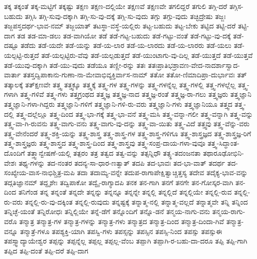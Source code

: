 {ತಕ್ಕ
ತಕ್ಕಂತೆ
ತಕ್ಕ-ಮಟ್ಟಿಗೆ
ತಕ್ಕಷ್ಟು
ತಕ್ಷಣ
ತಕ್ಷಣ-ದಲ್ಲಿಯೇ
ತಕ್ಷಣವೆ
ತಕ್ಷಣವೇ
ತಗಲಿದ್ದರೆ
ತಗುಲಿ
ತಗ್ಗಿ-ದರೆ
ತಗ್ಗಿಸ-ಬಹುದು
ತಗ್ಗಿಸಿ
ತಗ್ಗಿ-ಸುವು-ದಕ್ಕಾಗಿ
ತಗ್ಗಿ-ಸು-ವು-ದಕ್ಕೆ
ತಗ್ಗಿ-ಸು-ವುದು
ತಗ್ಗು
ತಗ್ಗು-ವುದು
ತಚ್ಛಿದ್ರೇಷು
ತಜ್ಜಃ
ತಜ್ಜಪಸ್ತದರ್ಥ-ಭಾವ-ನಮ್
ತಜ್ಜಯಾತ್
ತಟಸ್ಥಾ-ವಸ್ಥೆ-ಯಲ್ಲಿರು
ತಟ್ಟ-ಬಹುದು
ತಟ್ಟ-ಬೇಕು
ತಟ್ಟಿದ
ತಟ್ಟಿ-ದರೆ
ತಟ್ಟಿ-ದಾಗ
ತಡ
ತಡ-ಮಾ-ಡಲು
ತಡ-ವಾಗಿಯೋ
ತಡೆ
ತಡೆ-ಗಟ್ಟ-ಬಹುದು
ತಡೆ-ಗಟ್ಟು-ವಂತೆ
ತಡೆ-ಗಟ್ಟು-ವು-ದಕ್ಕೆ
ತಡೆ-ದಷ್ಟೂ
ತಡೆದು
ತಡೆ-ಯದೇ
ತಡೆ-ಯನ್ನು
ತಡೆ-ಯ-ಲಾರ
ತಡೆ-ಯ-ಲಾರದು
ತಡೆ-ಯ-ಲಾರರು
ತಡೆ-ಯಲು
ತಡೆ-ಯಲ್ಪಟ್ಟಿ-ರುತ್ತದೆ
ತಡೆ-ಯಲ್ಪಟ್ಟಿರು-ವೆವು
ತಡೆ-ಯಲ್ಪಡುತ್ತದೆ
ತಡೆ-ಯುಂಟಾಗು-ವು-ದಿಲ್ಲ
ತಡೆ-ಯುತ್ತದೆ
ತಡೆ-ಯುತ್ತವೆ
ತಡೆ-ಯುವು-ದಕ್ಕಾಗಿ
ತಡೆ-ಯು-ವುದು
ತಡೆಯೂ
ತಣ್ಣೀ-ರನ್ನು
ತತಃ
ತತಃಪ್ರಾತಿಭಶ್ರಾವಣ-ವೇದ-ನಾದರ್ಶಾಸ್ವಾದ-ವಾರ್ತಾ
ತತಸ್ತದ್ವಿಪಾಕಾನು-ಗುಣಾ-ನಾ-ಮೇವಾಭಿವ್ಯಕ್ತಿರ್ವಾಸ-ನಾಮ್
ತತೋ
ತತೋ-ಣಿಮಾದಿಪ್ರಾ-ದುರ್ಭಾವಃ
ತತ್
ತತ್ಕಾಲಕ್ಕೆ
ತತ್ಕ್ಷಣವೇ
ತತ್ತ್ವ
ತತ್ತ್ವಕ್ಕೂ
ತತ್ತ್ವಕ್ಕೆ
ತತ್ತ್ವ-ಗಳ
ತತ್ತ್ವ-ಗಳನ್ನು
ತತ್ತ್ವ-ಗಳನ್ನೆಲ್ಲ
ತತ್ತ್ವ-ಗಳಲ್ಲಿ
ತತ್ತ್ವ-ಗಳಲ್ಲೆಲ್ಲ
ತತ್ತ್ವ-ಗಳಾಗಿ
ತತ್ತ್ವ-ಗಳಿವೆ
ತತ್ತ್ವ-ಗಳು
ತತ್ತ್ವಗ್ರಂಥದ
ತತ್ತ್ವಜ್ಞ
ತತ್ತ್ವಜ್ಞ-ನಾದ
ತತ್ತ್ವಜ್ಞ-ರಂತೆ
ತತ್ತ್ವಜ್ಞ-ರಾ-ಗಲು
ತತ್ತ್ವಜ್ಞರು
ತತ್ತ್ವಜ್ಞಾನಿ
ತತ್ತ್ವಜ್ಞಾನಿ-ಗಳಾ-ಗಿದ್ದರು
ತತ್ತ್ವಜ್ಞಾನಿ-ಗಳಿಗೆ
ತತ್ತ್ವಜ್ಞಾನಿ-ಗಳಿ-ರು-ವರು
ತತ್ತ್ವಜ್ಞಾನಿ-ಗಳು
ತತ್ತ್ವಜ್ಞಾನಿಯೂ
ತತ್ತ್ವದ
ತತ್ತ್ವ-ದಲ್ಲಿ
ತತ್ತ್ವ-ದಲ್ಲೆಲ್ಲೂ
ತತ್ತ್ವ-ದಿಂದ
ತತ್ತ್ವ-ಭಾ-ಗಕ್ಕೆ
ತತ್ತ್ವ-ಭಾ-ವನೆ
ತತ್ತ್ವ-ಮಸಿ
ತತ್ತ್ವ-ವನ್ನಾ-ಗಲೀ
ತತ್ತ್ವ-ವನ್ನಾಗಿ
ತತ್ತ್ವ-ವನ್ನು
ತತ್ತ್ವ-ವಾ-ಗಿ-ರುವನು
ತತ್ತ್ವ-ವಾಗು-ವನು
ತತ್ತ್ವ-ವಾಗು-ವು-ದನ್ನು
ತತ್ತ್ವ-ವಾ-ಯಿತು
ತತ್ತ್ವ-ವಿದೆ
ತತ್ತ್ವವು
ತತ್ತ್ವ-ವೆನ್ನು-ವರು
ತತ್ತ್ವ-ವೇನೆಂದರೆ
ತತ್ತ್ವ-ಶಕ್ತಿ-ಯನ್ನು
ತತ್ತ್ವ-ಶಾಸ್ತ್ರ
ತತ್ತ್ವ-ಶಾಸ್ತ್ರ-ಗಳ
ತತ್ತ್ವ-ಶಾಸ್ತ್ರ-ಗಳಿಗೂ
ತತ್ತ್ವ-ಶಾಸ್ತ್ರಜ್ಞದ
ತತ್ತ್ವ-ಶಾಸ್ತ್ರಜ್ಞ-ರಿಗೆ
ತತ್ತ್ವ-ಶಾಸ್ತ್ರಜ್ಞರು
ತತ್ತ್ವ-ಶಾಸ್ತ್ರದ
ತತ್ತ್ವ-ಶಾಸ್ತ್ರ-ದಿಂದ
ತತ್ತ್ವ-ಶಾಸ್ತ್ರವು
ತತ್ತ್ವ-ಸಂಪ್ರ-ದಾಯ-ಗಳಾ-ವುವೂ
ತತ್ತ್ವ-ಸಿದ್ಧಾಂತ-ದೊಂದಿಗೆ
ತತ್ತ್ವಾನ್ವೇಷಣೆ-ಯಲ್ಲಿ
ತತ್ಪರಂ
ತತ್ರ
ತತ್ವದ
ತತ್ವ-ವನ್ನು
ತತ್ಸನ್ನಿಧೌ
ತತ್ಸ್ಥ-ತದಂಜನತಾ
ತಥಾರೂಢೋಭಿನಿ-ವೇಶಃ
ತಥ್ಯ-ಗಳನ್ನು
ತದ-ನಂತರ
ತದನ್ಯ-ಸಾ-ಧಾರ-ಣತ್ವಾತ್
ತದಪಿ
ತದ-ಭಾವಃ
ತದ-ಭಾ-ವಾತ್
ತದರ್ಥ
ತದ-ಸಂಖ್ಯೇಯ-ವಾಸ-ನಾಭಿಶ್ಚಿತ್ರ-ಮಪಿ
ತದಾ
ತದಾಮ್ಯ-ವನ್ನೇ
ತದುಪ-ರಾಗಾಪೇಕ್ಷಿತ್ವಾಚ್ಚಿತ್ತಸ್ಯ
ತದೇವ
ತದೈಕ್ಯ-ಭಾವ-ವನ್ನು
ತದ್ಗತಿಜ್ಞಾನಮ್
ತದ್ದೃಶೇಃ
ತದ್ವಿಪಾಕೋ
ತದ್ವೈ-ರಾಗ್ಯಾದಪಿ
ತನಕ
ತನ-ಗಾಗಿ
ತನಗೆ
ತನಗೇ
ತನ-ಗೋಸ್ಕರ-ವಾಗಿ
ತನ-ದಿಂದ
ತನಿಗೆಂಡ
ತನ್ನ
ತನ್ನಂತೆ
ತನ್ನದೇ
ತನ್ನನ್ನು
ತನ್ನನ್ನೂ
ತನ್ನನ್ನೇ
ತನ್ನಲ್ಲಿ
ತನ್ನಲ್ಲಿದೆ
ತನ್ನಲ್ಲಿಯೇ
ತನ್ನಲ್ಲಿ-ರುವ
ತನ್ನಲ್ಲಿ-ರು-ವರು
ತನ್ನಲ್ಲಿ-ರು-ವು-ದಕ್ಕಿಂತ
ತನ್ನಲ್ಲಿ-ರುವುದು
ತನ್ನಷ್ಟಕ್ಕೆ
ತನ್ನಾತ್ಮ-ನಲ್ಲಿ
ತನ್ನಾತ್ಮ-ವಲ್ಲದೆ
ತನ್ನಾತ್ಮವೇ
ತನ್ನಿ
ತನ್ನಿಂದ
ತನ್ನಿಚ್ಛೆ-ಯಂತೆ
ತನ್ನಿರೋಧಃ
ತನ್ನಿಲ್ಲಿಯೇ
ತನ್ನೆ-ಡೆಗೆ
ತನ್ನೊಂದಿಗೆ
ತನ್ನೊ-ಡನೆ
ತನ್ಮಯ-ನಾಗು-ವನು
ತನ್ಮಯ-ರಾಗು-ವರೊ
ತನ್ಮಾತ್ರ
ತನ್ಮಾತ್ರ-ಗಳ
ತನ್ಮಾತ್ರ-ಗಳನ್ನು
ತನ್ಮಾತ್ರ-ಗಳು
ತನ್ಮಾತ್ರದ
ತನ್ಮಾತ್ರ-ದಿಂದ
ತನ್ಮಾತ್ರ-ದಿಂದಾ-ಗಿವೆ
ತನ್ಮಾತ್ರ-ವನ್ನೂ
ತನ್ಮಾತ್ರೆ-ಗಳೂ
ತಪಶ್ಯಕ್ತಿ-ಯಾಗಿ
ತಪಸ್ವಿ-ಗಳು
ತಪಸ್ಸನ್ನು
ತಪಸ್ಸಿನ
ತಪಸ್ಸಿ-ನಿಂದ
ತಪಸ್ಸು
ತಪಸ್ಸುಈ
ತಪಸ್ಸ್ವಾದ್ಯಾಯೇಶ್ವರ
ತಪ್ಪನ್ನು
ತಪ್ಪನ್ನೆಲ್ಲ
ತಪ್ಪಲ್ಲ
ತಪ್ಪಲ್ಲ-ವೆಂಬ
ತಪ್ಪಾಗಿ
ತಪ್ಪಾಗಿ-ರ-ಬಹು-ದಾ-ದರೂ
ತಪ್ಪಿ
ತಪ್ಪಿ-ಗಾಗಿ
ತಪ್ಪಿದ
ತಪ್ಪಿ-ದಂತೆ
ತಪ್ಪಿ-ದರೆ
ತಪ್ಪಿ-ದಾಗ
}
